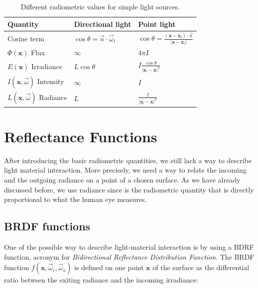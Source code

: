 \renewcommand{\arraystretch}{1.8}
\begin{table}[!ht]
    \centering
    \begin{tabularx}{0.95\textwidth}{|X|X|X|}
    \hline
    Quantity   & Directional light & Point light \\ \hline
    Cosine term       & $\cos\theta = \vec{n} \cdot \vec{\omega}_l$ & $\cos\theta = \frac{(\mathbf{x} - \mathbf{x}_l) \cdot \vec{n}}{|\mathbf{x} - \mathbf{x}_l|}$     \\ \hline

    $\Phi(\mathbf{x})$ Flux       & $\infty$                  & $4 \pi I$           \\ \hline
    $E(\mathbf{x})$ Irradiance & $L \cos\theta $                 & $I \frac{\cos\theta}{|\mathbf{x}_l - \mathbf{x}|^2}$          \\ \hline
    $I(\mathbf{x},\vec{\omega})$ Intensity  & $\infty$                 & $I$           \\ \hline
    $L(\mathbf{x},\vec{\omega})$ Radiance   & $L$               & $\frac{I}{|\mathbf{x}_l - \mathbf{x}|^2}$           \\ \hline
    \end{tabularx}
\caption{Different radiometric values for simple light sources.}
\label{table:radio}
\end{table}

\section{Reflectance Functions}
 
After introducing the basic radiometric quantities, we still lack a way to describe light material interaction. More precisely, we need a way to relate the incoming and the outgoing radiance on a point of a chosen surface. As we have already discussed before, we use radiance since is the radiometric quantity that is directly proportional to what the human eye measures. 

\subsection{BRDF functions}

One of the possible way to describe light-material interaction is by using a BDRF function, acronym for \emph{Bidirectional Reflectance Distribution Function}. The BRDF function $f(\mathbf{x}, \vec{\omega}_i, \vec{\omega}_o)$ is defined on one point $\mathbf{x}$ of the surface as the differential ratio between the exiting radiance and the incoming irradiance:

